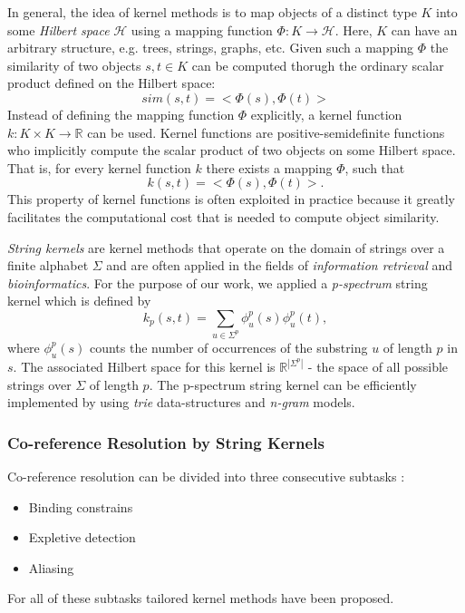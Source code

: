 In general, the idea of kernel methods is to map objects of a
distinct type $K$ into some \textit{Hilbert space} $\mathcal{H}$ using a mapping function $\Phi :
K \rightarrow \mathcal{H}$. Here, $K$ can have an arbitrary structure, e.g. trees, strings,
graphs, etc. Given such a mapping $\Phi$ the similarity of two objects $s,t \in K$ can be computed
thorugh the ordinary scalar product defined on the Hilbert space:
\[sim(s,t) = <\Phi(s),\Phi(t)>\]
Instead of defining the mapping function $\Phi$ explicitly, a kernel function $k : K \times K
\rightarrow \mathbb{R}$ can be used. Kernel functions are positive-semidefinite functions
who implicitly compute the scalar product of two objects on some Hilbert space. That is, for every
kernel function $k$ there exists a mapping $\Phi$, such that
\[k(s,t) = <\Phi(s),\Phi(t)>.\]
This property of kernel functions is often exploited in practice because it greatly facilitates the
computational cost that is needed to compute object similarity.

\textit{String kernels} are kernel methods  that operate on the domain of strings over
a finite alphabet $\Sigma$ and are often applied in the fields of \textit{information
retrieval} and \textit{bioinformatics}. For the purpose of our work, we applied a
\textit{p-spectrum} string kernel  which is defined by
\[k_p(s,t) = \sum_{u \in \Sigma^p}{\phi_u^p(s)\phi_u^p(t)},\]
where $\phi_u^p(s)$ counts the number of occurrences of the substring $u$ of length $p$ in $s$. The
associated Hilbert space for this kernel is $\mathbb{R}^{|\Sigma^p|}$ - the space of all possible
strings over $\Sigma$ of length $p$. The p-spectrum string kernel can be efficiently implemented by using \textit{trie} data-structures and \textit{n-gram} models.

\subsubsection{Co-reference Resolution by String Kernels}
\label{sec:co_reference_resolution_by_string_kernels}
Co-reference resolution can be divided into three consecutive subtasks \cite{string_kernel_coref}:
\begin{itemize}
  \item Binding constrains
  \item Expletive detection
  \item Aliasing
\end{itemize}
For all of these subtasks tailored kernel methods have been proposed.

